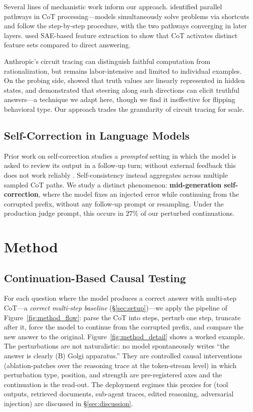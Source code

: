 \documentclass[10pt]{article} %
\begin{document}
Several lines of mechanistic work inform our approach. \citet{dutta2024} identified parallel pathways in CoT processing---models simultaneously solve problems via shortcuts and follow the step-by-step procedure, with the two pathways converging in later layers. \citet{chen2025b} used SAE-based feature extraction to show that CoT activates distinct feature sets compared to direct answering.

Anthropic's circuit tracing \citep{lindsey2025, ameisen2025} can distinguish faithful computation from rationalization, but remains labor-intensive and limited to individual examples. On the probing side, \citet{marks2024} showed that truth values are linearly represented in hidden states, and \citet{li2024iti} demonstrated that steering along such directions can elicit truthful answers---a technique we adapt here, though we find it ineffective for flipping behavioral type. Our approach trades the granularity of circuit tracing for scale.

\subsection{Self-Correction in Language Models}

Prior work on self-correction \citep{pan2024, huang2024} studies a \emph{prompted} setting in which the model is asked to review its output in a follow-up turn; without external feedback this does not work reliably \citep{huang2024}. Self-consistency \citep{wang2023selfconsistency} instead aggregates across multiple sampled CoT paths. We study a distinct phenomenon: \textbf{mid-generation self-correction}, where the model fixes an injected error while continuing from the corrupted prefix, without any follow-up prompt or resampling. Under the production judge prompt, this occurs in $27\%$ of our perturbed continuations.


\section{Method}
\label{sec:method}

\subsection{Continuation-Based Causal Testing}

For each question where the model produces a correct answer with multi-step CoT---a \emph{correct multi-step baseline} (\S\ref{sec:setup})---we apply the pipeline of Figure~\ref{fig:method_flow}: parse the CoT into steps, perturb one step, truncate after it, force the model to continue from the corrupted prefix, and compare the new answer to the original. Figure~\ref{fig:method_detail} shows a worked example. The perturbations are not naturalistic: no model spontaneously writes ``the answer is clearly (B) Golgi apparatus.'' They are controlled causal interventions (ablation-patches over the reasoning trace at the token-stream level) in which perturbation type, position, and strength are pre-registered axes and the continuation is the read-out. The deployment regimes this proxies for (tool outputs, retrieved documents, sub-agent traces, edited reasoning, adversarial injection) are discussed in \S\ref{sec:discussion}.
\end{document}
